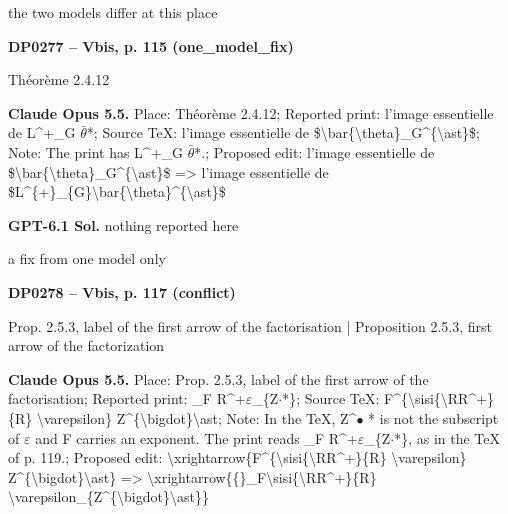 the two models differ at this place\par
\par\noindent\hypertarget{DP0277}{}\textbf{DP0277 -- Vbis, p. 115 (one\_model\_fix)}\par
Théorème 2.4.12\par
\textbf{Claude Opus 5.5.} Place: Théorème 2.4.12; Reported print: l'image essentielle de L\textasciicircum{}+\_G \ensuremath{\bar{\theta}}*; Source TeX: l'image essentielle de \$\textbackslash{}bar\{\textbackslash{}theta\}\_G\textasciicircum{}\{\textbackslash{}ast\}\$; Note: The print has L\textasciicircum{}+\_G \ensuremath{\bar{\theta}}*.; Proposed edit: l'image essentielle de \$\textbackslash{}bar\{\textbackslash{}theta\}\_G\textasciicircum{}\{\textbackslash{}ast\}\$ =\allowbreak > l'image essentielle de \$L\textasciicircum{}\{+\}\_\{G\}\textbackslash{}bar\{\textbackslash{}theta\}\textasciicircum{}\{\textbackslash{}ast\}\$\par
\textbf{GPT-6.1 Sol.} nothing reported here\par
a fix from one model only\par
\par\noindent\hypertarget{DP0278}{}\textbf{DP0278 -- Vbis, p. 117 (conflict)}\par
Prop. 2.5.3, label of the first arrow of the factorisation | Proposition 2.5.3, first arrow of the factorization\par
\textbf{Claude Opus 5.5.} Place: Prop. 2.5.3, label of the first arrow of the factorisation; Reported print: \_F R\textasciicircum{}+\ensuremath{\varepsilon}\_\{Z\ensuremath{\cdot}*\}; Source TeX: F\textasciicircum{}\{\textbackslash{}sisi\{\textbackslash{}RR\textasciicircum{}+\}\{R\} \textbackslash{}varepsilon\} Z\textasciicircum{}\{\textbackslash{}bigdot\}\textbackslash{}ast; Note: In the TeX, Z\textasciicircum{}\ensuremath{\bullet} * is not the subscript of \ensuremath{\varepsilon} and F carries an exponent. The print reads \_F R\textasciicircum{}+\ensuremath{\varepsilon}\_\{Z\ensuremath{\cdot}*\}, as in the TeX of p. 119.; Proposed edit: \textbackslash{}xrightarrow\{F\textasciicircum{}\{\textbackslash{}sisi\{\textbackslash{}RR\textasciicircum{}+\}\{R\} \textbackslash{}varepsilon\} Z\textasciicircum{}\{\textbackslash{}bigdot\}\textbackslash{}ast\} =\allowbreak > \textbackslash{}xrightarrow\{\{\}\_F\textbackslash{}sisi\{\textbackslash{}RR\textasciicircum{}+\}\{R\} \textbackslash{}varepsilon\_\{Z\textasciicircum{}\{\textbackslash{}bigdot\}\textbackslash{}ast\}\}\par
